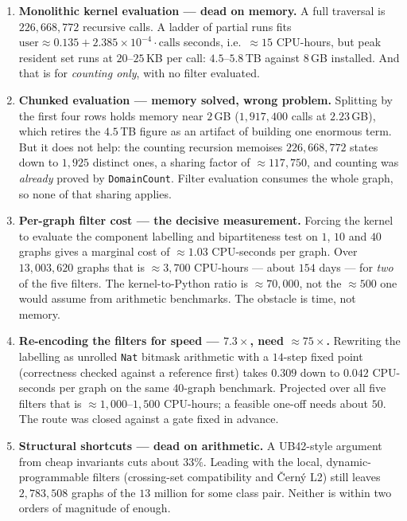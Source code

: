 \documentclass[11pt,a4paper]{article}
\theoremstyle{plain}
\theoremstyle{definition}
\theoremstyle{remark}
\begin{document}
\begin{enumerate}[leftmargin=*]
  \item \textbf{Monolithic kernel evaluation --- dead on memory.} A full
    traversal is $226{,}668{,}772$ recursive calls. A ladder of partial runs fits
    $\text{user} \approx 0.135 + 2.385\times10^{-4}\cdot\text{calls}$ seconds,
    i.e.\ ${\approx}15$ CPU-hours, but peak resident set runs at
    $20$--$25$\,KB per call: $4.5$--$5.8$\,TB against $8$\,GB installed. And that
    is for \emph{counting only}, with no filter evaluated.
  \item \textbf{Chunked evaluation --- memory solved, wrong problem.} Splitting
    by the first four rows holds memory near $2$\,GB
    ($1{,}917{,}400$ calls at $2.23$\,GB), which retires the $4.5$\,TB figure as
    an artifact of building one enormous term. But it does not help: the
    counting recursion memoises $226{,}668{,}772$ states down to $1{,}925$
    distinct ones, a sharing factor of ${\approx}117{,}750$, and counting was
    \emph{already} proved by \texttt{DomainCount}. Filter evaluation consumes the
    whole graph, so none of that sharing applies.
  \item \textbf{Per-graph filter cost --- the decisive measurement.} Forcing the
    kernel to evaluate the component labelling and bipartiteness test on
    $1$, $10$ and $40$ graphs gives a marginal cost of ${\approx}1.03$ CPU-seconds
    per graph. Over $13{,}003{,}620$ graphs that is ${\approx}3{,}700$ CPU-hours
    --- about $154$ days --- for \emph{two} of the five filters. The
    kernel-to-Python ratio is ${\approx}70{,}000$, not the ${\approx}500$ one
    would assume from arithmetic benchmarks. The obstacle is time, not memory.
  \item \textbf{Re-encoding the filters for speed --- $7.3\times$, need
    ${\approx}75\times$.} Rewriting the labelling as unrolled \texttt{Nat}
    bitmask arithmetic with a $14$-step fixed point (correctness checked against
    a reference first) takes $0.309$ down to $0.042$ CPU-seconds per graph on the
    same $40$-graph benchmark. Projected over all five filters that is
    ${\approx}1{,}000$--$1{,}500$ CPU-hours; a feasible one-off needs about $50$.
    The route was closed against a gate fixed in advance.
  \item \textbf{Structural shortcuts --- dead on arithmetic.} A
    \textsf{UB42}-style argument from cheap invariants cuts about $33\%$. Leading
    with the local, dynamic-programmable filters (crossing-set compatibility and
    {\v C}ern{\'y} L2) still leaves $2{,}783{,}508$ graphs of the $13$ million for
    some class pair. Neither is within two orders of magnitude of enough.
\end{enumerate}
\end{document}
